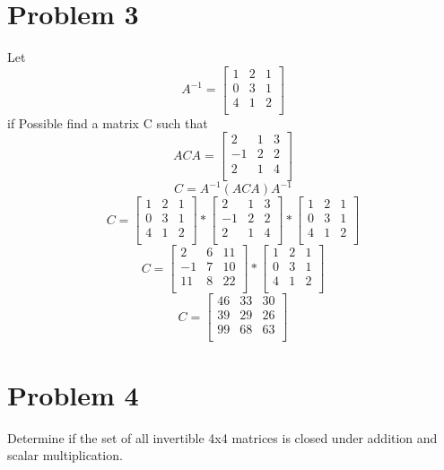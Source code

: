 \documentclass[11pt,a4paper,openany]{report}
\begin{document}
\section{Problem 3}
Let \[
A^{-1}=
\begin{bmatrix} 
1 & 2 & 1\\
0 & 3 & 1 \\
4 & 1 & 2 \\
\end{bmatrix}
\]
if Possible find a matrix C such that \[
ACA=
\begin{bmatrix} 
2 & 1 & 3\\
-1 & 2 & 2 \\
2 & 1 & 4 \\
\end{bmatrix}
\]
\[C=A^{-1}(ACA)A^{-1}\]
\[
C=
\begin{bmatrix} 
1 & 2 & 1\\
0 & 3 & 1 \\
4 & 1 & 2 \\
\end{bmatrix}
*
\begin{bmatrix} 
2 & 1 & 3\\
-1 & 2 & 2 \\
2 & 1 & 4 \\
\end{bmatrix}
*
\begin{bmatrix} 
1 & 2 & 1\\
0 & 3 & 1 \\
4 & 1 & 2 \\
\end{bmatrix}
\]
\[
C=
\begin{bmatrix} 
2 & 6 & 11\\
-1 & 7 & 10 \\
11 & 8 & 22 \\
\end{bmatrix}
*
\begin{bmatrix} 
1 & 2 & 1\\
0 & 3 & 1 \\
4 & 1 & 2 \\
\end{bmatrix}
\]
\[
C=
\begin{bmatrix} 
46 & 33 & 30\\
39 & 29 & 26 \\
99 & 68 & 63 \\
\end{bmatrix}
\]

\section{Problem 4}
Determine if the set of all invertible 4x4 matrices is closed under addition
and scalar multiplication.
\end{document}
